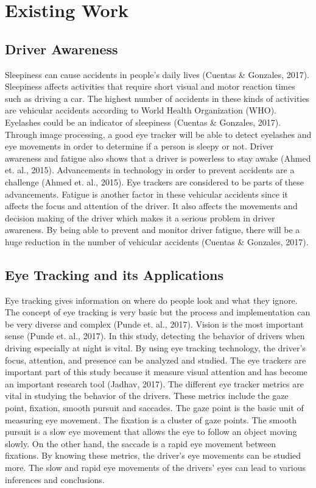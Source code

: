 \section{Existing Work}
\subsection{Driver Awareness}
Sleepiness can cause accidents in people’s daily lives (Cuentas \& Gonzales, 2017). Sleepiness affects activities that require short visual and motor reaction times such as driving a car. The highest number of accidents in these kinds of activities are vehicular accidents according to World Health Organization (WHO). Eyelashes could be an indicator of sleepiness (Cuentas \& Gonzales, 2017). Through image processing, a good eye tracker will be able to detect eyelashes and eye movements in order to determine if a person is sleepy or not. Driver awareness and fatigue also shows that a driver is powerless to stay awake (Ahmed et. al., 2015). Advancements in technology in order to prevent accidents are a challenge (Ahmed et. al., 2015). Eye trackers are considered to be parts of these advancements. Fatigue is another factor in these vehicular accidents since it affects the focus and attention of the driver. It also affects the movements and decision making of the driver which makes it a serious problem in driver awareness. By being able to prevent and monitor driver fatigue, there will be a huge reduction in the number of vehicular accidents (Cuentas \& Gonzales, 2017).

\subsection{Eye Tracking and its Applications}
Eye tracking gives information on where do people look and what they ignore. The concept of eye tracking is very basic but the process and implementation can be very diverse and complex (Punde et. al., 2017). Vision is the most important sense (Punde et. al., 2017). In this study, detecting the behavior of drivers when driving especially at night is vital. By using eye tracking technology, the driver’s focus, attention, and presence can be analyzed and studied. The eye trackers are important part of this study because it measure visual attention and has become an important research tool (Jadhav, 2017). The different eye tracker metrics are vital in studying the behavior of the drivers. These metrics include the gaze point, fixation, smooth pursuit and saccades. The gaze point is the basic unit of measuring eye movement. The fixation is a cluster of gaze points. The smooth pursuit is a slow eye movement that allows the eye to follow an object moving slowly. On the other hand, the saccade is a rapid eye movement between fixations. By knowing these metrics, the driver’s eye movements can be studied more. The slow and rapid eye movements of the drivers’ eyes can lead to various inferences and conclusions.
\newline 

